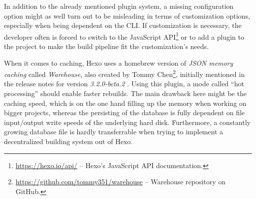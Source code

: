 In addition to the already mentioned plugin system, a missing configuration option might as well turn out to be misleading in terms of customization options, especially when being dependent on the CLI. If customization is necessary, the developer often is forced to switch to the JavaScript API\footnote{\url{https://hexo.io/api/} -- Hexo's JavaScript API documentation.} or to add a plugin to the project to make the build pipeline fit the customization's needs.

When it comes to caching, Hexo uses a homebrew version of \emph{JSON memory caching} called \emph{Warehouse}, also created by Tommy Chen\footnote{\url{https://github.com/tommy351/warehouse} -- Warehouse repository on GitHub.}, initially mentioned in the release notes for version \emph{3.2.0-beta.2} \cite{Chen2015hexorelease}. Using this plugin, a mode called ``hot processing'' should enable faster rebuilds. The main drawback here might be the caching speed, which is on the one hand filling up the memory when working on bigger projects, whereas the persisting of the database is fully dependent on file input/output write speeds of the underlying hard disk.
Furthermore, a constantly growing database file is hardly transferrable when trying to implement a decentralized building system out of Hexo.
